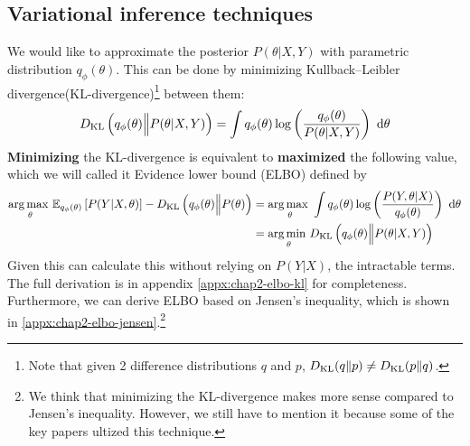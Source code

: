 \subsection{Variational inference techniques}
\label{sec:chap2-vi-technique}
We would like to approximate the posterior $P(\theta | X, Y)$ with parametric distribution $q_{\phi} (\theta)$. This can be done by minimizing Kullback–Leibler divergence(KL-divergence)\footnote{Note that given 2 difference distributions $q$ and $p$, $D_{\mathrm{KL}}(q \| p) \ne D_{\mathrm{KL}}(p \| q)$.} between them:
\begin{equation}
    D_{\mathrm{KL}}\left( q_{\phi} (\theta) \Big\| P(\theta | X, Y) \right) = \int q_{\phi} (\theta) \log\left( \frac{q_{\phi} (\theta)}{P(\theta | X, Y)} \right) \ \mathrm{d} \theta
\end{equation}
\textbf{Minimizing} the KL-divergence is equivalent to \textbf{maximized} the following value, which we will called it Evidence lower bound (ELBO) defined by
\begin{equation}
\begin{aligned}
    \underset{\theta}{\arg\max \ } \mathbb{E}_{q_{\phi} (\theta)} \left[ P(Y | X, \theta) \right] - D_{\mathrm{KL}} \left(q_{\phi} (\theta) \Big\| P(\theta) \right) &= \underset{\theta}{\arg\max \ } \int q_{\phi}(\theta)\log\left(\frac{P(Y, \theta | X)}{q_{\phi}(\theta)}\right) \ \mathrm{d} \theta \\
    &= \underset{\theta }{\arg\min \ } D_{\mathrm{KL}}\left( q_{\phi} (\theta) \Big\| P(\theta | X, Y) \right)
\end{aligned}
\end{equation}
Given this can calculate this without relying on $P(Y | X)$, the intractable terms. The full derivation is in appendix \ref{appx:chap2-elbo-kl} for completeness. Furthermore, we can derive ELBO based on Jensen's inequality, which is shown in \ref{appx:chap2-elbo-jensen}.\footnote{We think that minimizing the KL-divergence makes more sense compared to Jensen's inequality. However, we still have to mention it because some of the key papers ultized this technique.}

